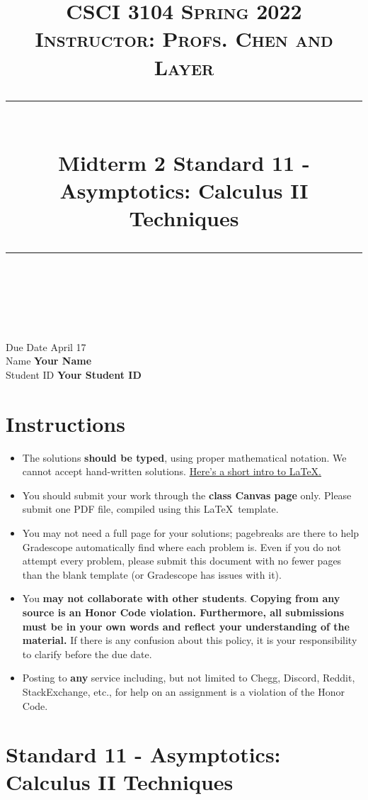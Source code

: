 \documentclass[11pt]{article}
\title{
\normalfont \normalsize 
\textsc{CSCI 3104 Spring 2022\\
Instructor: Profs. Chen and Layer} \\
[10pt] 
\rule{\linewidth}{0.5pt} \\[6pt] 
\huge Midterm 2 Standard 11 - Asymptotics: Calculus II Techniques \\
\rule{\linewidth}{2pt}  \\[10pt]
}
\date{}
\theoremstyle{definition}
\theoremstyle{definition}
\theoremstyle{definition}
\begin{document}
\maketitle


\noindent
Due Date \dotfill  April 17\\
Name \dotfill \textbf{Your Name} \\
Student ID \dotfill \textbf{Your Student ID} \\


\tableofcontents

\section{Instructions}
 \begin{itemize}
	\item The solutions \textbf{should be typed}, using proper mathematical notation. We cannot accept hand-written solutions. \href{http://ece.uprm.edu/~caceros/latex/introduction.pdf}{Here's a short intro to \LaTeX.}
	\item You should submit your work through the \textbf{class Canvas page} only. Please submit one PDF file, compiled using this \LaTeX \ template.
	\item You may not need a full page for your solutions; pagebreaks are there to help Gradescope automatically find where each problem is. Even if you do not attempt every problem, please submit this document with no fewer pages than the blank template (or Gradescope has issues with it).

	\item You \textbf{may not collaborate with other students}. \textbf{Copying from any source is an Honor Code violation. Furthermore, all submissions must be in your own words and reflect your understanding of the material.} If there is any confusion about this policy, it is your responsibility to clarify before the due date. 

	\item Posting to \textbf{any} service including, but not limited to Chegg, Discord, Reddit, StackExchange, etc., for help on an assignment is a violation of the Honor Code.

\end{itemize}


\newpage
\section{Standard 11 - Asymptotics: Calculus II Techniques}
\end{document}
